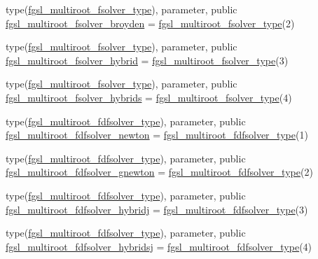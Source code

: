 \begin{DoxyCompactItemize}
\item 
type(\hyperlink{structfgsl_1_1fgsl__multiroot__fsolver__type}{fgsl\+\_\+multiroot\+\_\+fsolver\+\_\+type}), parameter, public \hyperlink{namespacefgsl_aaa51198ecabbc2cc4e7cd469492acedc}{fgsl\+\_\+multiroot\+\_\+fsolver\+\_\+broyden} = \hyperlink{structfgsl_1_1fgsl__multiroot__fsolver__type}{fgsl\+\_\+multiroot\+\_\+fsolver\+\_\+type}(2)
\item 
type(\hyperlink{structfgsl_1_1fgsl__multiroot__fsolver__type}{fgsl\+\_\+multiroot\+\_\+fsolver\+\_\+type}), parameter, public \hyperlink{namespacefgsl_acca2b12319b40798b2dc4dd347fcc4b5}{fgsl\+\_\+multiroot\+\_\+fsolver\+\_\+hybrid} = \hyperlink{structfgsl_1_1fgsl__multiroot__fsolver__type}{fgsl\+\_\+multiroot\+\_\+fsolver\+\_\+type}(3)
\item 
type(\hyperlink{structfgsl_1_1fgsl__multiroot__fsolver__type}{fgsl\+\_\+multiroot\+\_\+fsolver\+\_\+type}), parameter, public \hyperlink{namespacefgsl_abd283e94024c75208f98eb64fd4a8833}{fgsl\+\_\+multiroot\+\_\+fsolver\+\_\+hybrids} = \hyperlink{structfgsl_1_1fgsl__multiroot__fsolver__type}{fgsl\+\_\+multiroot\+\_\+fsolver\+\_\+type}(4)
\item 
type(\hyperlink{structfgsl_1_1fgsl__multiroot__fdfsolver__type}{fgsl\+\_\+multiroot\+\_\+fdfsolver\+\_\+type}), parameter, public \hyperlink{namespacefgsl_ae80cc34511a1cc786b0fb5617e3929ed}{fgsl\+\_\+multiroot\+\_\+fdfsolver\+\_\+newton} = \hyperlink{structfgsl_1_1fgsl__multiroot__fdfsolver__type}{fgsl\+\_\+multiroot\+\_\+fdfsolver\+\_\+type}(1)
\item 
type(\hyperlink{structfgsl_1_1fgsl__multiroot__fdfsolver__type}{fgsl\+\_\+multiroot\+\_\+fdfsolver\+\_\+type}), parameter, public \hyperlink{namespacefgsl_a4ecb43f393dacc9cefa731f8aec97f40}{fgsl\+\_\+multiroot\+\_\+fdfsolver\+\_\+gnewton} = \hyperlink{structfgsl_1_1fgsl__multiroot__fdfsolver__type}{fgsl\+\_\+multiroot\+\_\+fdfsolver\+\_\+type}(2)
\item 
type(\hyperlink{structfgsl_1_1fgsl__multiroot__fdfsolver__type}{fgsl\+\_\+multiroot\+\_\+fdfsolver\+\_\+type}), parameter, public \hyperlink{namespacefgsl_a3a3728bb3d1d1a699c08a4a02af2eac1}{fgsl\+\_\+multiroot\+\_\+fdfsolver\+\_\+hybridj} = \hyperlink{structfgsl_1_1fgsl__multiroot__fdfsolver__type}{fgsl\+\_\+multiroot\+\_\+fdfsolver\+\_\+type}(3)
\item 
type(\hyperlink{structfgsl_1_1fgsl__multiroot__fdfsolver__type}{fgsl\+\_\+multiroot\+\_\+fdfsolver\+\_\+type}), parameter, public \hyperlink{namespacefgsl_a4d6c0533915b025bbb86fb16727964ca}{fgsl\+\_\+multiroot\+\_\+fdfsolver\+\_\+hybridsj} = \hyperlink{structfgsl_1_1fgsl__multiroot__fdfsolver__type}{fgsl\+\_\+multiroot\+\_\+fdfsolver\+\_\+type}(4)

\end{DoxyCompactItemize}
